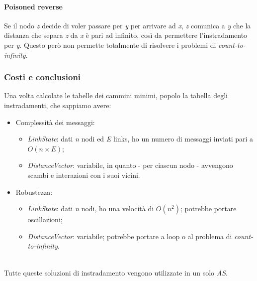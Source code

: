 \paragraph{Poisoned reverse}
Se il nodo \textit{z} decide di voler passare per \textit{y} per arrivare ad \textit{x}, \textit{z} comunica a \textit{y} che la distanza che separa \textit{z} da \textit{x} è pari ad infinito, così da permettere l'instradamento per \textit{y}. Questo però non permette totalmente di risolvere i problemi di \textit{count-to-infinity}.

\subsubsection{Costi e conclusioni}
Una volta calcolate le tabelle dei cammini minimi, popolo la tabella degli instradamenti, che sappiamo avere:
\begin{itemize}
	\item Complessità dei messaggi:
	\begin{itemize}
		\item \textit{LinkState}: dati \textit{n} nodi ed \textit{E} links, ho un numero di messaggi inviati pari a $O(n\times E)$;
		\item \textit{DistanceVector}: variabile, in quanto - per ciascun nodo - avvengono scambi e interazioni con i suoi vicini.
	\end{itemize}
	\item Robustezza:
	\begin{itemize}
		\item \textit{LinkState}: dati \textit{n} nodi, ho una velocità di $O(n^2)$; potrebbe portare oscillazioni;
		\item \textit{DistanceVector}: variabile; potrebbe portare a loop o al problema di \textit{count-to-infinity}.
	\end{itemize}
\end{itemize} \hfill \\
Tutte queste soluzioni di instradamento vengono utilizzate in un solo \textit{AS}.

